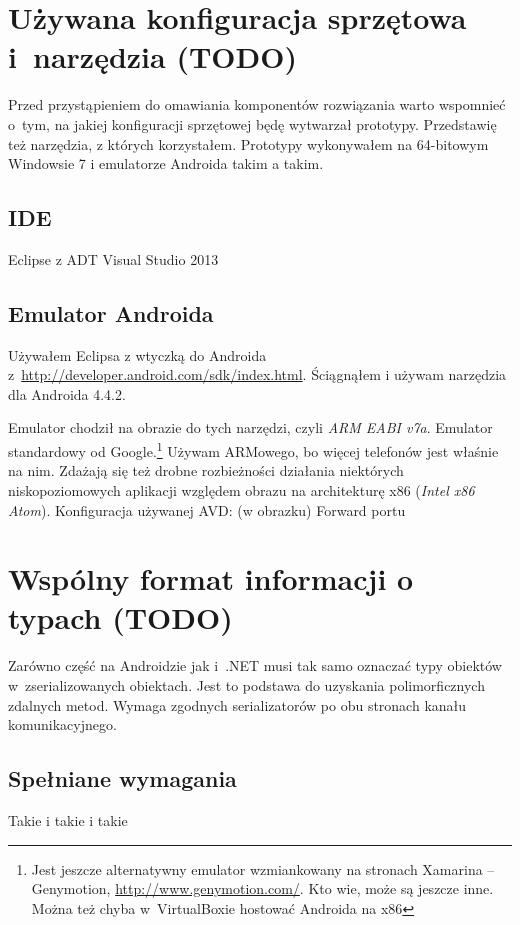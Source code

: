 \section{Używana konfiguracja sprzętowa i~narzędzia (TODO)}
Przed przystąpieniem do omawiania komponentów rozwiązania warto wspomnieć o~tym, na jakiej konfiguracji sprzętowej będę wytwarzał prototypy. Przedstawię też narzędzia, z których korzystałem.
Prototypy wykonywałem na 64-bitowym Windowsie 7 i emulatorze Androida takim a takim.

\subsection{IDE}
Eclipse z ADT
Visual Studio 2013


\subsection{Emulator Androida}
\label{android-emulator}
Używałem Eclipsa z wtyczką do Androida z~\url{http://developer.android.com/sdk/index.html}.
Ściągnąłem i używam narzędzia dla Androida 4.4.2.

Emulator chodził na obrazie do tych narzędzi, czyli \emph{ARM EABI v7a}. Emulator standardowy od Google.\footnote{Jest jeszcze alternatywny emulator wzmiankowany na stronach Xamarina -- Genymotion, \url{http://www.genymotion.com/}. Kto wie, może są jeszcze inne. Można też chyba w~VirtualBoxie hostować Androida na x86}
Używam ARMowego, bo więcej telefonów jest właśnie na nim. Zdażają się też drobne rozbieżności działania niektórych niskopoziomowych aplikacji względem obrazu na architekturę x86 (\emph{Intel x86 Atom}).
Konfiguracja używanej AVD: (w obrazku)
Forward portu


\section{Wspólny format informacji o typach (TODO)}
Zarówno część na Androidzie jak i~.NET musi tak samo oznaczać typy obiektów w~zserializowanych obiektach.
Jest to podstawa do uzyskania polimorficznych zdalnych metod.
Wymaga zgodnych serializatorów po obu stronach kanału komunikacyjnego.


\subsection{Spełniane wymagania}
Takie i takie i takie


